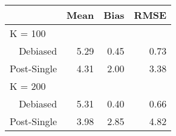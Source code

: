 \captionsetup[table]{labelformat=empty,skip=1pt}
\begin{longtable}{r|rrr}
\toprule
\multicolumn{1}{l}{} & Mean & Bias & RMSE \\ 
\midrule
\multicolumn{1}{l}{K = 100} \\ 
\midrule
Debiased & 5.29 & 0.45 & 0.73 \\ 
Post-Single & 4.31 & 2.00 & 3.38 \\ 
\midrule
\multicolumn{1}{l}{K = 200} \\ 
\midrule
Debiased & 5.31 & 0.40 & 0.66 \\ 
Post-Single & 3.98 & 2.85 & 4.82 \\ 
\bottomrule
\end{longtable}

